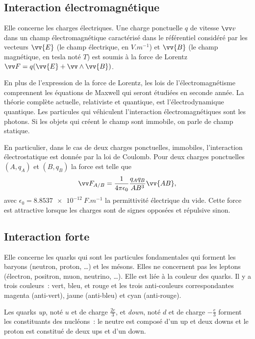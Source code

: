 \subsection{Interaction électromagnétique}
\label{chap2-subsec:interactionelectromagnetique}

Elle concerne les charges électriques. Une charge ponctuelle \(q\) de vitesse
$\vvv$ dans un champ électromagnétique caractérisé dans le référentiel
considéré par les vecteurs \(\vv{E}\) (le champ électrique, en \(\si{V.m^{-1}}\))
et \(\vv{B}\) (le champ magnétique, en tesla noté \(\si{T}\)) est soumis à la
force de Lorentz \(\vF = q(\vv{E}+\vv \wedge \vv{B})\).

En plus de l'expression de la force de Lorentz, les lois de
l'électromagnétisme comprennent les équations de Maxwell qui seront étudiées
en seconde année. La théorie complète actuelle, relativiste et quantique, est
l'électrodynamique quantique. Les particules qui véhiculent l'interaction
électromagnétiques sont les photons. Si les objets qui créent le champ sont
immobile, on parle de champ statique.

En particulier, dans le cas de deux charges ponctuelles, immobiles,
l'interaction électrostatique est donnée par la loi de Coulomb. Pour deux
charges ponctuelles \((A, q_A)\) et \((B, q_B)\) la force est telle que
\begin{equation} \vF_{A/B} = \frac{1}{4\pi \epsilon_0} \frac{q_A q_B}{AB^3}
\vv{AB}, \end{equation} avec \(\epsilon_0 = \SI{8,8537e-12}{F.m^{-1}}\) la
permittivité électrique du vide. Cette force est attractive lorsque les
charges sont de signes opposées et répulsive sinon.

\subsection{Interaction forte}
\label{chap2-subsec:interactionforte}

Elle concerne les quarks qui sont les particules fondamentales qui forment
les baryons (neutron, proton, \ldots) et les mésons. Elles ne concernent pas
les leptons (électron, positron, muon, neutrino, \ldots). Elle est liée à la
couleur des quarks. Il y a trois couleurs~: vert, bleu, et rouge et les trois
anti-couleurs correspondantes magenta (anti-vert), jaune (anti-bleu) et cyan
(anti-rouge).

Les quarks \emph{up}, noté \(u\) et de charge \(\frac{2e}{3}\), et \emph{down},
noté \(d\) et de charge \(-\frac{e}{3}\) forment les constituants des nucléons~:
le neutre est composé d'un up et deux downs et le proton est constitué de
deux ups et d'un down.

